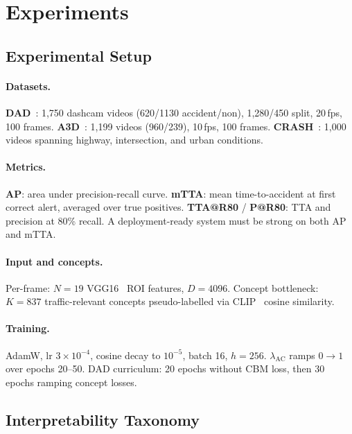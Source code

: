 \documentclass[lettersize,journal]{IEEEtran}
\begin{document}


\section{Experiments}
\label{sec:experiments}

\subsection{Experimental Setup}

\paragraph{Datasets.}
\textbf{DAD}~\citep{ref4}: 1,750 dashcam videos (620/1130 accident/non), 1,280/450 split, 20\,fps, 100 frames.
\textbf{A3D}~\citep{liao2024crash}: 1,199 videos (960/239), 10\,fps, 100 frames.
\textbf{CRASH}~\citep{liao2024crash}: 1,000 videos spanning highway, intersection, and urban conditions.

\paragraph{Metrics.}
\textbf{AP}: area under precision-recall curve.
\textbf{mTTA}: mean time-to-accident at first correct alert, averaged over true positives.
\textbf{TTA@R80} / \textbf{P@R80}: TTA and precision at 80\% recall.
A deployment-ready system must be strong on both AP and mTTA.

\paragraph{Input and concepts.}
Per-frame: $N{=}19$ VGG16~\citep{ref31} ROI features, $D{=}4096$.
Concept bottleneck: $K{=}837$ traffic-relevant concepts pseudo-labelled via CLIP~\citep{radford2021learning} cosine similarity.

\paragraph{Training.}
AdamW, lr $3{\times}10^{-4}$, cosine decay to $10^{-5}$, batch 16, $h{=}256$.
$\lambda_{\text{AC}}$ ramps $0{\to}1$ over epochs 20--50.
DAD curriculum: 20 epochs without CBM loss, then 30 epochs ramping concept losses.

\subsection{Interpretability Taxonomy}
\end{document}

